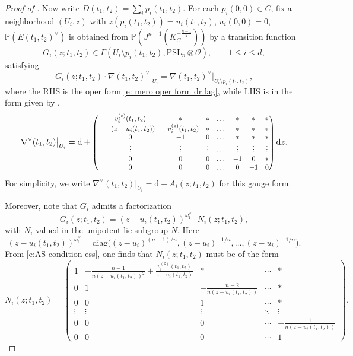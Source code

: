 \documentclass[10pt,a4paper]{amsart}
\begin{document}
\begin{proof}[Proof of ]
Now write
\(
D(t_1,t_2)=\sum_i p_i(t_1,t_2)
\).
For each $p_i(0,0)\in C$, fix a neighborhood $(U_i,z)$ with $z(p_i(t_1,t_2))=u_i(t_1,t_2)$, $u_i(0,0)=0$, $\mathbb P(E(t_1,t_2)^{\vee})$ is obtained from $\mathbb P(J^{n-1}(K_C^{-\frac{n-1}{2}}))$ by a transition
function
\[
G_i(z;t_1,t_2)\in
\Gamma(U_i\setminus p_i(t_1,t_2),\mathrm{PSL}_n\otimes\mathcal O),\qquad 1 \leq i \leq d,
\]
satisfying
\begin{equation}\label{e:AS condition ess}
G_i(z;t_1,t_2)\cdot
\nabla(t_1,t_2)^{\vee}\big|_{U_i}
=
\nabla(t_1,t_2)^{\vee}\big|_{U_i\setminus p_i(t_1,t_2)},
\end{equation}
where the RHS is the oper form \eqref{e: mero oper form dr lag}, while LHS is in the form given by ,
\begin{equation}\label{e:form of nabla check Ui}
\nabla^{\vee}(t_1,t_2)\big|_{U_i}
= \mathrm{d} +
\scalebox{0.85}{$
\begin{pmatrix}
        &v^{(z)}_i(t_1,t_2)  &\ast &\ast &\dots &\ast &\ast &\ast  \\
        &-(z-u_i(t_1,t_2)) &-v^{(z)}_i(t_1,t_2) &\ast &\dots &\ast &\ast &\ast \\
        &0 &-1  &0 &\dots &\ast &\ast &\ast \\
        &\vdots &\vdots &\vdots &\dots &\vdots  &\vdots &\vdots \\
        &0  &0 &0 &\dots &-1 &0 &\ast \\
        &0  &0 &0 &\dots &0 &-1 & 0 
    \end{pmatrix}
$}\,\mathrm{d}z .
\end{equation}
For simplicity, we write $\nabla^{\vee}(t_1,t_2)\big|_{U_i} = \mathrm{d} + A_i(z;t_1,t_2)$ for this gauge form.

Moreover, note that $G_i$ admits a factorization
\[
G_i(z;t_1,t_2)
=(z-u_i(t_1,t_2))^{\omega_1^{\vee}}\cdot N_i(z;t_1,t_2),
\]
with $N_i$ valued in the unipotent lie subgroup $N$.
Here
\[
(z-u_i(t_1,t_2))^{\omega_1^{\vee}}
=
\mathrm{diag}\bigl(
(z-u_i)^{(n-1)/n},
(z-u_i)^{-1/n},\dots,(z-u_i)^{-1/n}
\bigr).
\]
From \eqref{e:AS condition ess},
one finds that $N_i(z;t_1,t_2)$ must be of the form
\begin{equation}\label{e:form of Ni}
N_i(z;t_1,t_2)=
\begin{pmatrix}
 1 & -\frac{n-1}{n(z-u_i(t_1,t_2))^2}+\frac{v^{(z)}_i(t_1,t_2)}{z-u_i(t_1,t_2)} & * & \cdots & * \\
 0 & 1 & -\frac{n-2}{n(z-u_i(t_1,t_2))} & \cdots & * \\
 0 & 0 & 1 & \cdots & * \\
 \vdots & \vdots & \vdots & \ddots & \vdots \\
 0 & 0 & 0 & \cdots & -\frac{1}{n(z-u_i(t_1,t_2))} \\
 0 & 0 & 0 & \cdots & 1
\end{pmatrix}.
\end{equation}


\end{proof}
\end{document}
